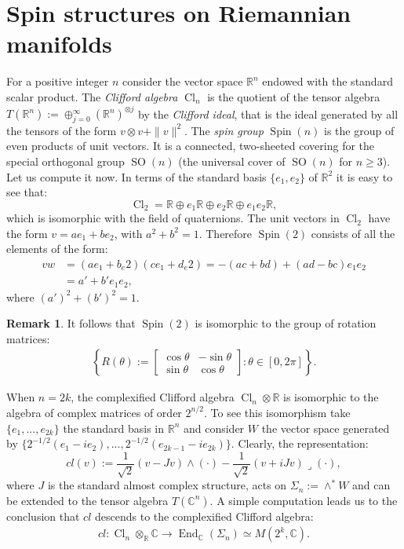 \documentclass[12pt]{amsart}
\theoremstyle{definition}
\newtheorem{remark}[proposition]{Remark}
\def\RR{{\mathbb R}}
\def\CC{{\mathbb C}}
\DeclareMathOperator{\End}{End}
\newcommand{\cl}{\operatorname{Cl}}
\newcommand{\so}{\operatorname{SO}}
\newcommand{\spin}{\operatorname{Spin}}
\begin{document}
\section{Spin structures on Riemannian manifolds}
For a positive integer $n$ consider the vector space $\RR^n$ endowed with the standard scalar product. The \emph{Clifford algebra} $\cl_n$ is the quotient of the tensor algebra $T(\RR^n):=\oplus_{j=0}^{\infty} (\RR^n)^{\otimes j}$ by the \emph{Clifford ideal}, that is the ideal generated by all the tensors of the form $v\otimes v + \|v \|^2$. The \emph{spin group} $\spin(n)$ is the group of even products of unit vectors. It is a connected, two-sheeted covering for the special orthogonal group $\so(n)$ (the universal cover of $\so(n)$ for $n\geq 3$). 
Let us compute it now. In terms of the standard basis $\{e_1,e_2 \}$ of $\RR^2$ it is easy to see that:
\[
\cl_2 = \RR \oplus e_1\RR \oplus e_2\RR \oplus e_1e_2\RR,
\]
which is isomorphic with the field of quaternions. The unit vectors in $\cl_2$ have the form $v=ae_1+be_2$, with $a^2+b^2=1$. Therefore $\spin(2)$ consists of all the elements of the form:
\begin{align*}
vw
&=
(ae_1+b_e2)(ce_1+d_e2)
=-(ac+bd) + (ad-bc)e_1e_2 \\
&= a' + b' e_1e_2,
\end{align*}
where $(a')^2+(b')^2=1$.
\begin{remark}\label{spinRotationsIsomorphism}
It follows that $\spin(2)$ is isomorphic to the group of rotation matrices: 
\begin{align*}
\left\lbrace
R(\theta):=
\begin{bmatrix}
\cos \theta & -\sin \theta \\
\sin \theta & \cos \theta
\end{bmatrix}
:
\theta \in [0,2\pi]
\right\rbrace.
\end{align*}
\end{remark}

When $n = 2k$, the complexified Clifford algebra $\cl_n \otimes \RR$ is isomorphic to the algebra of complex matrices of order $2^{n/2}$. To see this isomorphism take $\{ e_1,..., e_{2k} \}$ the standard basis in $\RR^n$ and consider $W$ the vector space generated by $\{ 2^{-1/2}(e_1 -ie_2), ..., 2^{-1/2}(e_{2k-1} - ie_{2k}) \}$. Clearly, the representation:
\[
cl(v):=\frac{1}{\sqrt{2}}(v-Jv)\wedge(\cdot) - \frac{1}{\sqrt{2}}(v+iJv)\lrcorner(\cdot),
\]
where $J$ is the standard almost complex structure, acts on $\Sigma_n:=\wedge^*W$ and can be extended to the tensor algebra $T(\CC^n)$. A simple computation leads us to the conclusion that $cl$ descends to the complexified Clifford algebra:
\begin{align*}
cl : \cl_n\otimes_{\RR}\CC \longrightarrow \End_{\CC} (\Sigma_n) \simeq M(2^k ,\CC).
\end{align*}
\end{document}
